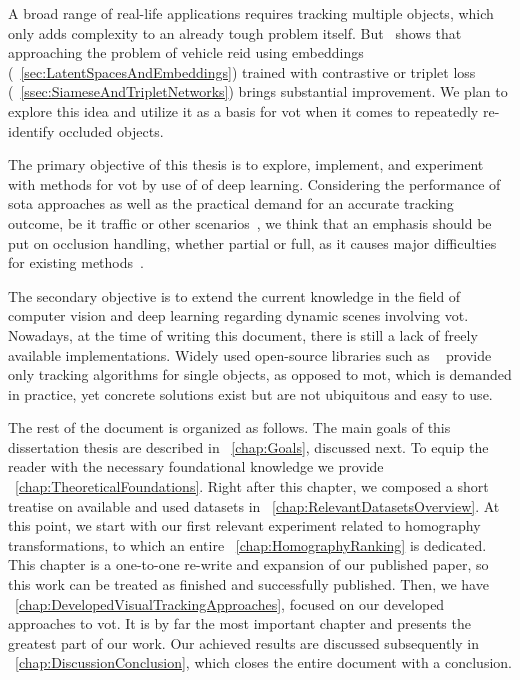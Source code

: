 A broad range of real-life applications requires tracking multiple objects, which only adds complexity to an already tough problem itself. But~\cite{kuma2019vehiclereid} shows that approaching the problem of vehicle \gls{reid} using embeddings (\sectiontext{}~\ref{sec:LatentSpacesAndEmbeddings}) trained with contrastive or triplet loss (\sectiontext{}~\ref{ssec:SiameseAndTripletNetworks}) brings substantial improvement. We plan to explore this idea and utilize it as a basis for \gls{vot} when it comes to repeatedly re-identify occluded objects.

The primary objective of this thesis is to explore, implement, and experiment with methods for \gls{vot} by use of of deep learning. Considering the performance of \gls{sota} approaches as well as the practical demand for an accurate tracking outcome, be it traffic or other scenarios~\cite{tang2019cityflow}, we think that an emphasis should be put on occlusion handling, whether partial or full, as it causes major difficulties for existing methods~\cite{jiyan2007robustocclusion}.

The secondary objective is to extend the current knowledge in the field of computer vision and deep learning regarding dynamic scenes involving \gls{vot}. Nowadays, at the time of writing this document, there is still a lack of freely available implementations. Widely used open-source libraries such as \opencv{}~\cite{bradski2000opencv} provide only tracking algorithms for single objects, as opposed to \gls{mot}, which is demanded in practice, yet concrete solutions exist but are not ubiquitous and easy to use.

The rest of the document is organized as follows. The main goals of this dissertation thesis are described in \chaptertext{}~\ref{chap:Goals}, discussed next. To equip the reader with the necessary foundational knowledge we provide \chaptertext{}~\ref{chap:TheoreticalFoundations}. Right after this chapter, we composed a short treatise on available and used datasets in \chaptertext{}~\ref{chap:RelevantDatasetsOverview}. At this point, we start with our first relevant experiment related to homography transformations, to which an entire \chaptertext{}~\ref{chap:HomographyRanking} is dedicated. This chapter is a one-to-one re-write and expansion of our published paper, so this work can be treated as finished and successfully published. Then, we have \chaptertext{}~\ref{chap:DevelopedVisualTrackingApproaches}, focused on our developed approaches to \gls{vot}. It is by far the most important chapter and presents the greatest part of our work. Our achieved results are discussed subsequently in \chaptertext{}~\ref{chap:DiscussionConclusion}, which closes the entire document with a conclusion.